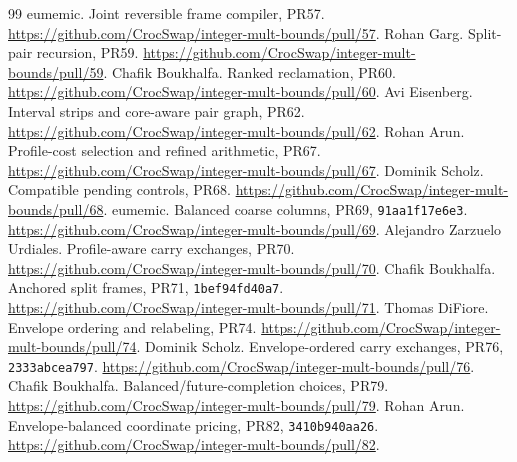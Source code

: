 \documentclass[11pt]{article}
\begin{document}
\begin{thebibliography}{99}
 eumemic. Joint reversible frame compiler, PR57.
\url{https://github.com/CrocSwap/integer-mult-bounds/pull/57}.
 Rohan Garg. Split-pair recursion, PR59.
\url{https://github.com/CrocSwap/integer-mult-bounds/pull/59}.
 Chafik Boukhalfa. Ranked reclamation, PR60.
\url{https://github.com/CrocSwap/integer-mult-bounds/pull/60}.
 Avi Eisenberg. Interval strips and core-aware pair graph, PR62.
\url{https://github.com/CrocSwap/integer-mult-bounds/pull/62}.
 Rohan Arun. Profile-cost selection and refined arithmetic, PR67.
\url{https://github.com/CrocSwap/integer-mult-bounds/pull/67}.
 Dominik Scholz. Compatible pending controls, PR68.
\url{https://github.com/CrocSwap/integer-mult-bounds/pull/68}.
 eumemic. Balanced coarse columns, PR69, \texttt{91aa1f17e6e3}.
\url{https://github.com/CrocSwap/integer-mult-bounds/pull/69}.
 Alejandro Zarzuelo Urdiales. Profile-aware carry exchanges, PR70.
\url{https://github.com/CrocSwap/integer-mult-bounds/pull/70}.
 Chafik Boukhalfa. Anchored split frames, PR71, \texttt{1bef94fd40a7}.
\url{https://github.com/CrocSwap/integer-mult-bounds/pull/71}.
 Thomas DiFiore. Envelope ordering and relabeling, PR74.
\url{https://github.com/CrocSwap/integer-mult-bounds/pull/74}.
 Dominik Scholz. Envelope-ordered carry exchanges, PR76,
\texttt{2333abcea797}. \url{https://github.com/CrocSwap/integer-mult-bounds/pull/76}.
 Chafik Boukhalfa. Balanced/future-completion choices, PR79.
\url{https://github.com/CrocSwap/integer-mult-bounds/pull/79}.
 Rohan Arun. Envelope-balanced coordinate pricing, PR82,
\texttt{3410b940aa26}. \url{https://github.com/CrocSwap/integer-mult-bounds/pull/82}.
\end{thebibliography}
\end{document}
